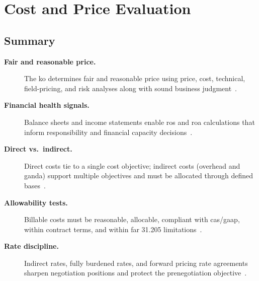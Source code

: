 \documentclass[../main.tex]{subfiles}
\begin{document}

\section{Cost and Price Evaluation}

\subsection{Summary}
\begin{description}
  \item[\textbf{Fair and reasonable price.}] The \ac{ko} determines fair and reasonable price using price, cost, technical, field-pricing, and risk analyses along with sound business judgment~\autocite{edo-3-2-4-cost-price-evaluation-2025,FAR-15-404-1-Proposal-Analysis,FAR-15-404-2-Field-Pricing-Assistance}.
  \item[\textbf{Financial health signals.}] Balance sheets and income statements enable \ac{ros} and \ac{roa} calculations that inform responsibility and financial capacity decisions~\autocite{edo-3-2-4-cost-price-evaluation-2025}.
  \item[\textbf{Direct vs.\ indirect.}] Direct costs tie to a single cost objective; indirect costs (overhead and \ac{ganda}) support multiple objectives and must be allocated through defined bases~\autocite{edo-3-2-4-cost-price-evaluation-2025,FAR-31-202-Direct-Costs,FAR-31-203-Indirect-Costs}.
  \item[\textbf{Allowability tests.}] Billable costs must be reasonable, allocable, compliant with \ac{cas}/\ac{gaap}, within contract terms, and within \ac{far} 31.205 limitations~\autocite{edo-3-2-4-cost-price-evaluation-2025,FAR-31-201-2-Allowability,FAR-31-205-Selected-Costs}.
  \item[\textbf{Rate discipline.}] Indirect rates, fully burdened rates, and forward pricing rate agreements sharpen negotiation positions and protect the prenegotiation objective~\autocite{edo-3-2-4-cost-price-evaluation-2025,FAR-15-406-1-Prenegotiation-Objectives,FAR-15-407-3-FPRA}.
\end{description}
\end{document}
